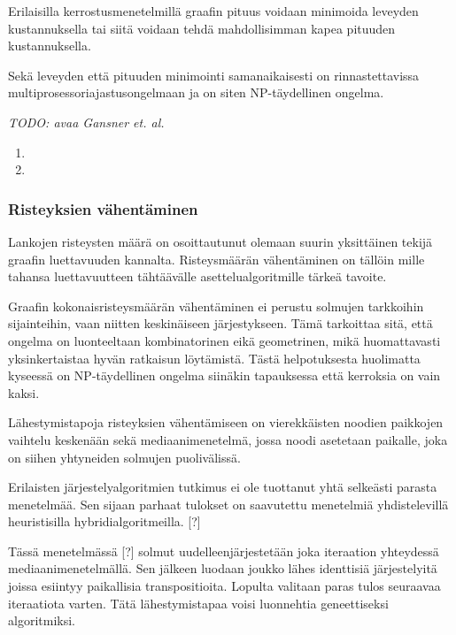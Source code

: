 \documentclass[finnish,12pt]{article}
\begin{document}
Erilaisilla kerrostusmenetelmillä graafin pituus voidaan minimoida leveyden kustannuksella tai siitä voidaan tehdä mahdollisimman kapea pituuden kustannuksella.

Sekä leveyden että pituuden minimointi samanaikaisesti on rinnastettavissa multiprosessoriajastusongelmaan ja on siten NP-täydellinen ongelma. \cite{RefWorks:39}

\emph{TODO: avaa Gansner et. al.}


\begin{enumerate}
	\item 
	\item 
\end{enumerate}

		\subsubsection{Risteyksien vähentäminen}

Lankojen risteysten määrä on osoittautunut olemaan suurin yksittäinen tekijä graafin luettavuuden kannalta. \cite{RefWorks:47}
Risteysmäärän vähentäminen on tällöin mille tahansa luettavuutteen tähtäävälle asettelualgoritmille tärkeä tavoite.

Graafin kokonaisristeysmäärän vähentäminen ei perustu solmujen tarkkoihin sijainteihin, vaan niitten keskinäiseen järjestykseen. Tämä tarkoittaa sitä, että ongelma on luonteeltaan kombinatorinen eikä geometrinen, mikä huomattavasti yksinkertaistaa hyvän ratkaisun löytämistä.
Tästä helpotuksesta huolimatta kyseessä on NP-täydellinen ongelma siinäkin tapauksessa että kerroksia on vain kaksi. \cite{RefWorks:40}

Lähestymistapoja risteyksien vähentämiseen on vierekkäisten noodien paikkojen
vaihtelu keskenään sekä mediaanimenetelmä, jossa noodi asetetaan paikalle, joka
on siihen yhtyneiden solmujen puolivälissä.


Erilaisten järjestelyalgoritmien tutkimus ei ole tuottanut yhtä selkeästi parasta menetelmää.
Sen sijaan parhaat tulokset on saavutettu menetelmiä yhdistelevillä heuristisilla hybridialgoritmeilla. [?]

Tässä menetelmässä [?] solmut uudelleenjärjestetään joka iteraation yhteydessä mediaanimenetelmällä.
Sen jälkeen luodaan joukko lähes identtisiä järjestelyitä joissa esiintyy paikallisia transpositioita.
Lopulta valitaan paras tulos seuraavaa iteraatiota varten.
Tätä lähestymistapaa voisi luonnehtia geneettiseksi algoritmiksi.
\end{document}
